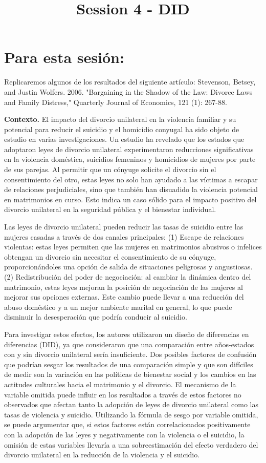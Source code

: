\documentclass[11pt,a4paper,english]{article}
\title{Session 4 - DID}
\author{}
\date{}
\begin{document}
\maketitle

\section*{Para esta sesión:} Replicaremos algunos de los resultados del
siguiente artículo: Stevenson, Betsey, and Justin Wolfers. 2006. "Bargaining in the Shadow of the Law: Divorce Laws and Family Distress," Quarterly Journal of Economics, 121 (1): 267-88.


\textbf{Contexto.} El impacto del divorcio unilateral en la violencia familiar y su potencial para reducir el suicidio y el homicidio conyugal ha sido objeto de estudio en varias investigaciones. Un estudio ha revelado que los estados que adoptaron leyes de divorcio unilateral experimentaron reducciones significativas en la violencia doméstica, suicidios femeninos y homicidios de mujeres por parte de sus parejas. Al permitir que un cónyuge solicite el divorcio sin el consentimiento del otro, estas leyes no solo han ayudado a las víctimas a escapar de relaciones perjudiciales, sino que también han disuadido la violencia potencial en matrimonios en curso. Esto indica un caso sólido para el impacto positivo del divorcio unilateral en la seguridad pública y el bienestar individual.

Las leyes de divorcio unilateral pueden reducir las tasas de suicidio entre las mujeres casadas a través de dos canales principales: (1) Escape de relaciones violentas: estas leyes permiten que las mujeres en matrimonios abusivos o infelices obtengan un divorcio sin necesitar el consentimiento de su cónyuge, proporcionándoles una opción de salida de situaciones peligrosas y angustiosas. (2) Redistribución del poder de negociación: al cambiar la dinámica dentro del matrimonio, estas leyes mejoran la posición de negociación de las mujeres al mejorar sus opciones externas. Este cambio puede llevar a una reducción del abuso doméstico y a un mejor ambiente marital en general, lo que puede disminuir la desesperación que podría conducir al suicidio.

Para investigar estos efectos, los autores utilizaron un diseño de diferencias
en diferencias (DID), ya que consideraron que una comparación entre años-estados
con y sin divorcio unilateral sería insuficiente. Dos posibles factores de
confusión que podrían sesgar los resultados de una comparación simple y que son
difíciles de medir son la variación en las políticas de bienestar social y los
cambios en las actitudes culturales hacia el matrimonio y el divorcio. El
mecanismo de la variable omitida puede influir en los resultados a través de
estos factores no observados que afectan tanto la adopción de leyes de divorcio
unilateral como las tasas de violencia y suicidio. Utilizando la fórmula de
sesgo por variable omitida, se puede argumentar que, si estos factores están
correlacionados positivamente con la adopción de las leyes y negativamente con
la violencia o el suicidio, la omisión de estas variables llevaría a una
sobreestimación del efecto verdadero del divorcio unilateral en la reducción de
la violencia y el suicidio.
\end{document}
